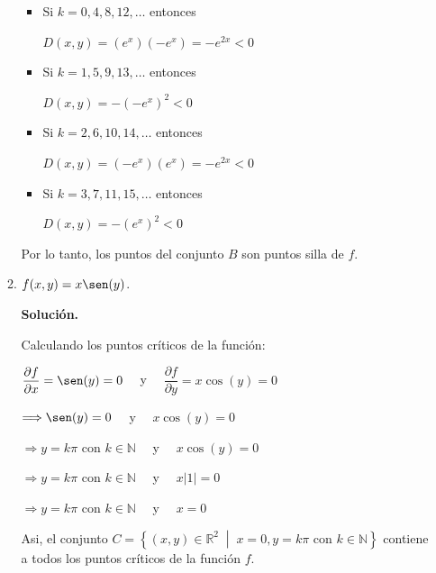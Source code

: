 \documentclass[fleqn, 12pt]{article}
\newcommand{\derivadaparcial}[2]{\dfrac{\partial {#1}}{\partial {#2}}}
\newcommand{\talque}{\; \middle | \;}
\begin{document}
\begin{enumerate}
\begin{enumerate}
            \begin{itemize}
                \item  Si $ k = 0, 4, 8, 12, \ldots $ entonces
            
                $ D(x,y) = \left( e^x \right) \left( -e^x \right) = -e^{2x} < 0 $

                \item  Si $ k = 1, 5, 9, 13, \ldots $ entonces

                $  D(x,y) = - \left( -e^x \right)^2 < 0 $

                \item  Si $ k = 2, 6, 10, 14, \ldots $ entonces

                $  D(x,y) = \left( -e^{x} \right) \left( e^{x} \right) = -e^{2x} < 0 $

                \item  Si $ k = 3, 7, 11, 15, \ldots $ entonces

                $  D(x,y) = - \left( e^x \right)^2 < 0 $
            \end{itemize}

           Por lo tanto, los puntos del conjunto $ B $ son puntos silla de $ f $.
            
            \item $ f(x,y) = x \sen (y) $.
            
            \textbf{Solución.}

            Calculando los puntos críticos de la función:

            $ \derivadaparcial{f}{x} = \sen (y) = 0 \quad $ y $ \quad \derivadaparcial{f}{y} = x \cos (y) = 0 $

            $ \Longrightarrow \sen (y) = 0 \quad $ y $ \quad x \cos (y) = 0 $

            $ \Longrightarrow y = k \pi \text{ con } k \in \mathbb{N} \quad $ y $ \quad x \cos (y) = 0 $

            $ \Longrightarrow y = k \pi \text{ con } k \in \mathbb{N} \quad $ y $ \quad x \lvert 1 \rvert = 0 $

            $ \Longrightarrow y = k \pi \text{ con } k \in \mathbb{N} \quad $ y $ \quad x = 0 $

            Asi, el conjunto $ C = \left\lbrace (x,y) \in \mathbb{R}^2 \talque x = 0, y = k \pi \text{ con } k \in \mathbb{N} \right\rbrace $ contiene a todos los puntos críticos de la función $ f $.


\end{enumerate}
\end{enumerate}
\end{document}
